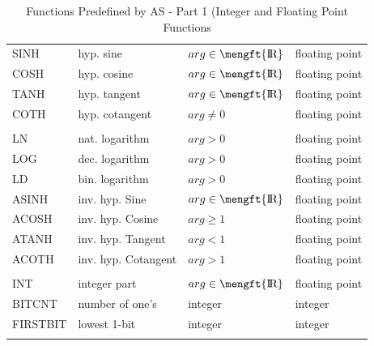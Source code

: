 \documentclass[12pt,twoside]{report}
\newcommand{\asname}{{AS}}
\def \rz{\hbox{\mengft{I \hskip -1.7mm R}}}
\begin{document}
\begin{center}
\begin{longtable}{|l|l|l|l|}
SINH     & hyp. sine            & $arg \in \rz$        & floating point \\
COSH     & hyp. cosine          & $arg \in \rz$        & floating point \\
TANH     & hyp. tangent         & $arg \in \rz$        & floating point \\
COTH     & hyp. cotangent       & $arg \neq 0$         & floating point \\
         &                      &                      & \\
LN       & nat. logarithm       & $arg > 0$            & floating point \\
LOG      & dec. logarithm       & $arg > 0$            & floating point \\
LD       & bin. logarithm       & $arg > 0$            & floating point \\
ASINH    & inv. hyp. Sine       & $arg \in \rz$        & floating point \\
ACOSH    & inv. hyp. Cosine     & $arg \geq 1$         & floating point \\
ATANH    & inv. hyp. Tangent    & $arg < 1$            & floating point \\
ACOTH    & inv. hyp. Cotangent  & $arg > 1$            & floating point \\
         &                      &                      & \\
INT      & integer part         & $arg \in \rz$        & floating point \\
\hline
BITCNT   & number of one's      & integer              & integer \\
FIRSTBIT & lowest 1-bit         & integer              & integer \\
\hline
\caption{Functions Predefined by \asname{} - Part 1 (Integer and
         Floating Point Functions \label{TabFuncs1}}
\end{longtable}\end{center}
\end{document}
